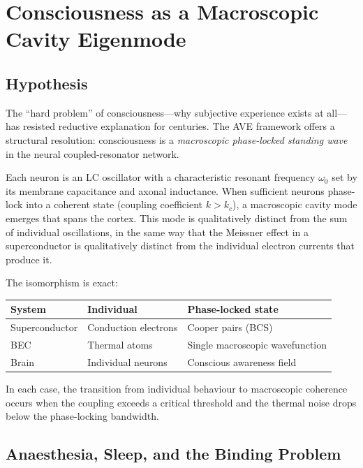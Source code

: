 \section{Consciousness as a Macroscopic Cavity Eigenmode}
\label{sec:consciousness}

\subsection{Hypothesis}

The ``hard problem'' of consciousness---why subjective experience
exists at all---has resisted reductive explanation for centuries.
The AVE framework offers a structural resolution: consciousness is
a \emph{macroscopic phase-locked standing wave} in the neural
coupled-resonator network.

Each neuron is an LC oscillator with a characteristic resonant
frequency $\omega_0$ set by its membrane capacitance and axonal
inductance.  When sufficient neurons phase-lock into a coherent
state (coupling coefficient $k > k_c$), a macroscopic cavity mode
emerges that spans the cortex.  This mode is qualitatively distinct
from the sum of individual oscillations, in the same way that the
Meissner effect in a superconductor is qualitatively distinct from
the individual electron currents that produce it.

The isomorphism is exact:
\begin{center}
\begin{tabular}{lll}
  \toprule
  \textbf{System} & \textbf{Individual} & \textbf{Phase-locked state} \\
  \midrule
  Superconductor & Conduction electrons & Cooper pairs (BCS) \\
  BEC            & Thermal atoms        & Single macroscopic wavefunction \\
  Brain          & Individual neurons   & Conscious awareness field \\
  \bottomrule
\end{tabular}
\end{center}

In each case, the transition from individual behaviour to
macroscopic coherence occurs when the coupling exceeds a critical
threshold and the thermal noise drops below the phase-locking
bandwidth.

\subsection{Anaesthesia, Sleep, and the Binding Problem}

